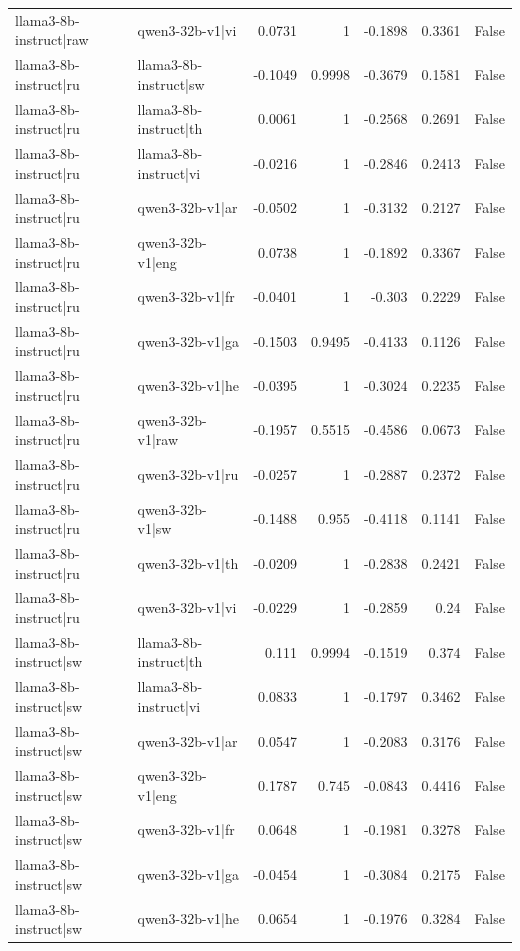 \begin{table}
\begin{tabular}{l l r r r r l}
llama3-8b-instruct|raw & qwen3-32b-v1|vi & 0.0731 & 1 & -0.1898 & 0.3361 & False \\
llama3-8b-instruct|ru & llama3-8b-instruct|sw & -0.1049 & 0.9998 & -0.3679 & 0.1581 & False \\
llama3-8b-instruct|ru & llama3-8b-instruct|th & 0.0061 & 1 & -0.2568 & 0.2691 & False \\
llama3-8b-instruct|ru & llama3-8b-instruct|vi & -0.0216 & 1 & -0.2846 & 0.2413 & False \\
llama3-8b-instruct|ru & qwen3-32b-v1|ar & -0.0502 & 1 & -0.3132 & 0.2127 & False \\
llama3-8b-instruct|ru & qwen3-32b-v1|eng & 0.0738 & 1 & -0.1892 & 0.3367 & False \\
llama3-8b-instruct|ru & qwen3-32b-v1|fr & -0.0401 & 1 & -0.303 & 0.2229 & False \\
llama3-8b-instruct|ru & qwen3-32b-v1|ga & -0.1503 & 0.9495 & -0.4133 & 0.1126 & False \\
llama3-8b-instruct|ru & qwen3-32b-v1|he & -0.0395 & 1 & -0.3024 & 0.2235 & False \\
llama3-8b-instruct|ru & qwen3-32b-v1|raw & -0.1957 & 0.5515 & -0.4586 & 0.0673 & False \\
llama3-8b-instruct|ru & qwen3-32b-v1|ru & -0.0257 & 1 & -0.2887 & 0.2372 & False \\
llama3-8b-instruct|ru & qwen3-32b-v1|sw & -0.1488 & 0.955 & -0.4118 & 0.1141 & False \\
llama3-8b-instruct|ru & qwen3-32b-v1|th & -0.0209 & 1 & -0.2838 & 0.2421 & False \\
llama3-8b-instruct|ru & qwen3-32b-v1|vi & -0.0229 & 1 & -0.2859 & 0.24 & False \\
llama3-8b-instruct|sw & llama3-8b-instruct|th & 0.111 & 0.9994 & -0.1519 & 0.374 & False \\
llama3-8b-instruct|sw & llama3-8b-instruct|vi & 0.0833 & 1 & -0.1797 & 0.3462 & False \\
llama3-8b-instruct|sw & qwen3-32b-v1|ar & 0.0547 & 1 & -0.2083 & 0.3176 & False \\
llama3-8b-instruct|sw & qwen3-32b-v1|eng & 0.1787 & 0.745 & -0.0843 & 0.4416 & False \\
llama3-8b-instruct|sw & qwen3-32b-v1|fr & 0.0648 & 1 & -0.1981 & 0.3278 & False \\
llama3-8b-instruct|sw & qwen3-32b-v1|ga & -0.0454 & 1 & -0.3084 & 0.2175 & False \\
llama3-8b-instruct|sw & qwen3-32b-v1|he & 0.0654 & 1 & -0.1976 & 0.3284 & False \\

\end{tabular}
\end{table}
